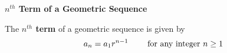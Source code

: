 {\bf $n^{th}$ Term of a Geometric Sequence}
\vskip 6pt

The {\bf $n^{th}$ term} of a geometric sequence is given by $$a_n=a_1r^{n-1}\qquad\hbox{ for any integer $n\geq 1$}$$

\vfill\eject
